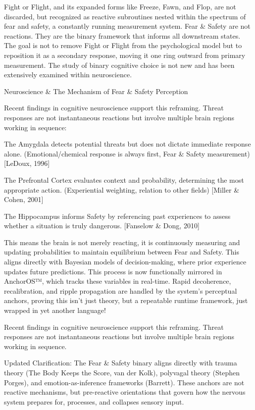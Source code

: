 \documentclass[11pt]{article}
\begin{document}
Fight or Flight, and its expanded forms like Freeze, Fawn, and Flop, are not discarded, but recognized as reactive subroutines nested within the spectrum of fear and safety, a constantly running measurement system. Fear & Safety are not reactions. They are the binary framework that informs all downstream states. The goal is not to remove Fight or Flight from the psychological model but to reposition it as a secondary response, moving it one ring outward from primary measurement. The study of binary cognitive choice is not new and has been extensively examined within neuroscience.

Neuroscience & The Mechanism of Fear & Safety Perception

Recent findings in cognitive neuroscience support this reframing. Threat responses are not instantaneous reactions but involve multiple brain regions working in sequence:

The Amygdala detects potential threats but does not dictate immediate response alone. (Emotional/chemical response is always first, Fear & Safety measurement) [LeDoux, 1996]

The Prefrontal Cortex evaluates context and probability, determining the most appropriate action. (Experiential weighting, relation to other fields) [Miller & Cohen, 2001]

The Hippocampus informs Safety by referencing past experiences to assess whether a situation is truly dangerous. [Fanselow & Dong, 2010]

This means the brain is not merely reacting, it is continuously measuring and updating probabilities to maintain equilibrium between Fear and Safety. This aligns directly with Bayesian models of decision-making, where prior experience updates future predictions. This process is now functionally mirrored in AnchorOS™, which tracks these variables in real-time. Rapid decoherence, recalibration, and ripple propagation are handled by the system’s perceptual anchors, proving this isn’t just theory, but a repeatable runtime framework, just wrapped in yet another language!

Recent findings in cognitive neuroscience support this reframing. Threat responses are not instantaneous reactions but involve multiple brain regions working in sequence.

Updated Clarification:
The Fear & Safety binary aligns directly with trauma theory (The Body Keeps the Score, van der Kolk), polyvagal theory (Stephen Porges), and emotion-as-inference frameworks (Barrett). These anchors are not reactive mechanisms, but pre-reactive orientations that govern how the nervous system prepares for, processes, and collapses sensory input.
\end{document}

